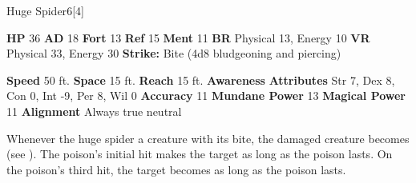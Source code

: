   \begin{monsubsection}{Huge Spider}{6}[4]
    \vspace{-1em}\vspace{-1em}
    \vspace{0em}

    
    

    \begin{spellcontent}
      \begin{spelltargetinginfo}
        \pari \textbf{HP} 36 \monsep
          \textbf{AD} 18 \monsep
          \textbf{Fort} 13 \monsep
          \textbf{Ref} 15 \monsep
          \textbf{Ment} 11
        \pari \textbf{BR} Physical 13, Energy 10 \monsep
        \textbf{VR} Physical 33, Energy 30
        \pari \textbf{Strike:}
            Bite  (4d8 bludgeoning and piercing)
      \end{spelltargetinginfo}
    \end{spellcontent}
    \begin{monsterfooter}
      \pari \textbf{Speed} 50 ft. \monsep
        \textbf{Space} 15 ft. \monsep
        \textbf{Reach} 15 ft.
      \pari \textbf{Awareness} 
      \pari \textbf{Attributes}
        Str 7, Dex 8,
        Con 0, Int -9,
        Per 8, Wil 0
      \pari \textbf{Accuracy} 11 \monsep
        \textbf{Mundane Power} 13 \monsep
      \textbf{Magical Power} 11
      \pari \textbf{Alignment} Always true neutral
    \end{monsterfooter}
  \end{monsubsection}
        Whenever the huge spider  a creature with its bite,
          the damaged creature becomes  (see ).
        The poison's initial hit makes the target  as long as the poison lasts.
        On the poison's third hit, the target becomes  as long as the poison lasts.
  

